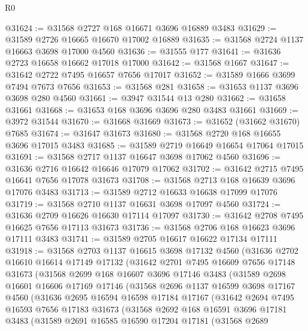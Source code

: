 \begin{lexlean}{R0}
\begin{coremodule}
@31624 := @31568 @2727 @168 @16671 @3696 @16889 @3483
@31629 := @31589 @2726 @16665 @16670 @17002 @16889
@31635 := @31568 @2724 @1137 @16663 @3698 @17000 @4560
@31636 := @31555 @177
@31641 := @31636 @2723 @16658 @16662 @17018 @17000
@31642 := @31568 @1667
@31647 := @31642 @2722 @7495 @16657 @7656 @17017
@31652 := @31589 @1666 @3699 @7494 @7673 @7656
@31653 := @31568 @281
@31658 := @31653 @1137 @3696 @3698 @280 @4560
@31661 := @3947 @31544 @13 @280
@31662 := @31658 @31661
@31668 := @31653 @168 @3696 @3696 @280 @3483 @31661
@31669 := @3972 @31544
@31670 := @31668 @31669
@31673 := @31652 (@31662 @31670) @7685
@31674 := @31647 @31673
@31680 := @31568 @2720 @168 @16655 @3696 @17015 @3483
@31685 := @31589 @2719 @16649 @16654 @17064 @17015
@31691 := @31568 @2717 @1137 @16647 @3698 @17062 @4560
@31696 := @31636 @2716 @16642 @16646 @17079 @17062
@31702 := @31642 @2715 @7495 @16641 @7656 @17078 @31673
@31708 := @31568 @2713 @168 @16639 @3696 @17076 @3483
@31713 := @31589 @2712 @16633 @16638 @17099 @17076
@31719 := @31568 @2710 @1137 @16631 @3698 @17097 @4560
@31724 := @31636 @2709 @16626 @16630 @17114 @17097
@31730 := @31642 @2708 @7495 @16625 @7656 @17113 @31673
@31736 := @31568 @2706 @168 @16623 @3696 @17111 @3483
@31741 := @31589 @2705 @16617 @16622 @17134 @17111
@31918 := @31568
    @2703
    @1137
    @16615
    @3698
    @17132
    @4560
    (@31636
      @2702
      @16610
      @16614
      @17149
      @17132
      (@31642
        @2701
        @7495
        @16609
        @7656
        @17148
        @31673
        (@31568
          @2699
          @168
          @16607
          @3696
          @17146
          @3483
          (@31589
            @2698
            @16601
            @16606
            @17169
            @17146
            (@31568
              @2696
              @1137
              @16599
              @3698
              @17167
              @4560
              (@31636
                @2695
                @16594
                @16598
                @17184
                @17167
                (@31642
                  @2694
                  @7495
                  @16593
                  @7656
                  @17183
                  @31673
                  (@31568
                    @2692
                    @168
                    @16591
                    @3696
                    @17181
                    @3483
                    (@31589
                      @2691
                      @16585
                      @16590
                      @17204
                      @17181
                      (@31568
                        @2689

\end{coremodule}
\end{lexlean}
